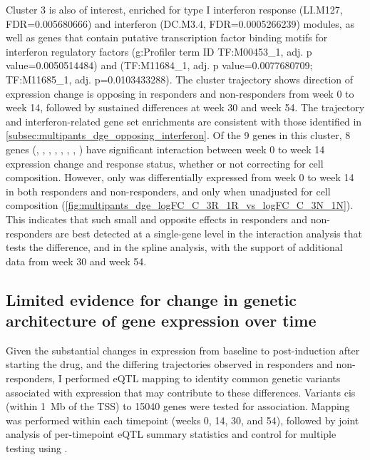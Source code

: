 Cluster 3 is also of interest, enriched for type I interferon response (LI.M127, FDR=\num{0.005680666}) and interferon (DC.M3.4, FDR=\num{0.0005266239}) modules,
as well as genes that contain putative transcription factor binding motifs for interferon regulatory factors  ({g:Profiler} term ID TF:M00453\_1, adj. p value=\num{0.0050514484}) 
and  (TF:M11684\_1, adj. p value=\num{0.0077680709}; TF:M11685\_1, adj. p=\num{0.0103433288}).
The cluster trajectory shows direction of expression change is opposing in responders and non-responders from week 0 to week 14, followed by sustained differences at week 30 and week 54.
The trajectory and interferon-related gene set enrichments are consistent with those identified in \cref{subsec:multipants_dge_opposing_interferon}.
Of the 9 genes in this cluster, 8 genes (, , , , , , , )
have significant interaction between week 0 to week 14 expression change and response status,
whether or not correcting for cell composition.
However, only  was differentially expressed from week 0 to week 14 in both responders and non-responders,
and only when unadjusted for cell composition (\cref{fig:multipants_dge_logFC_C_3R_1R_vs_logFC_C_3N_1N}).
This indicates that such small and opposite effects in responders and non-responders are best detected at a single-gene level in the interaction analysis that tests the difference,
and in the spline analysis, with the support of additional data from week 30 and week 54.

    
\subsection{Limited evidence for change in genetic architecture of gene expression over time}

Given the substantial changes in expression from baseline to post-induction after starting the drug, and the differing trajectories observed in responders and non-responders, 
I performed \gls{eQTL} mapping to identity common genetic variants associated with expression that may contribute to these differences.
Variants cis (within \SI{1}{\mega b} of the TSS) to 15040 genes were tested for association.
Mapping was performed within each timepoint (weeks 0, 14, 30, and 54),
followed by joint analysis of per-timepoint \gls{eQTL} summary statistics and control for multiple testing using .

